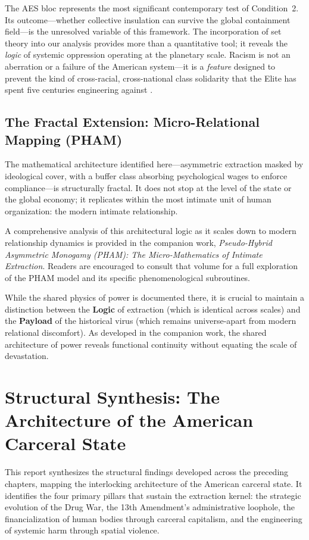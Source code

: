 \documentclass[12pt,openany]{book}
\begin{document}
The AES bloc represents the most significant contemporary test of Condition~2. Its outcome---whether collective insulation can survive the global containment field---is the unresolved variable of this framework. The incorporation of set theory into our analysis provides more than a quantitative tool; it reveals the \textit{logic} of systemic oppression operating at the planetary scale. Racism is not an aberration or a failure of the American system---it is a \textit{feature} designed to prevent the kind of cross-racial, cross-national class solidarity that the Elite has spent five centuries engineering against \cite{robinson, allen, bonillasilva}.

\section{The Fractal Extension: Micro-Relational Mapping (PHAM)}

The mathematical architecture identified here---asymmetric extraction masked by ideological cover, with a buffer class absorbing psychological wages to enforce compliance---is structurally fractal. It does not stop at the level of the state or the global economy; it replicates within the most intimate unit of human organization: the modern intimate relationship.

A comprehensive analysis of this architectural logic as it scales down to modern relationship dynamics is provided in the companion work, \textit{Pseudo-Hybrid Asymmetric Monogamy (PHAM): The Micro-Mathematics of Intimate Extraction}. Readers are encouraged to consult that volume for a full exploration of the PHAM model and its specific phenomenological subroutines.

While the shared physics of power is documented there, it is crucial to maintain a distinction between the \textbf{Logic} of extraction (which is identical across scales) and the \textbf{Payload} of the historical virus (which remains universe-apart from modern relational discomfort). As developed in the companion work, the shared architecture of power reveals functional continuity without equating the scale of devastation.

\chapter{Structural Synthesis: The Architecture of the American Carceral State}

This report synthesizes the structural findings developed across the preceding chapters, mapping the interlocking architecture of the American carceral state. It identifies the four primary pillars that sustain the extraction kernel: the strategic evolution of the Drug War, the 13th Amendment's administrative loophole, the financialization of human bodies through carceral capitalism, and the engineering of systemic harm through spatial violence.
\end{document}

